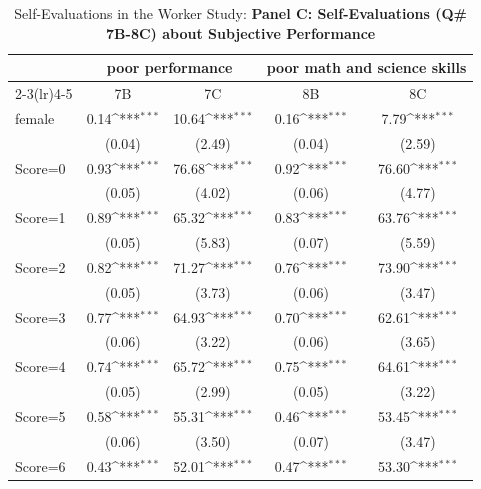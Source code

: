 \begin{table}[htbp]\centering
\def\sym#1{\ifmmode^{#1}\else\(^{#1}\)\fi}
\caption{Self-Evaluations in the Worker Study: \textbf{Panel C: Self-Evaluations (Q\# 7B-8C) about Subjective Performance}}
\begin{tabular}{l*{4}{c}}
\hline\hline
                &\multicolumn{2}{c}{poor performance} &\multicolumn{2}{c}{poor math and science skills}\\\cmidrule(lr){2-3}\cmidrule(lr){4-5}
                &\multicolumn{1}{c}{7B}&\multicolumn{1}{c}{7C}&\multicolumn{1}{c}{8B}&\multicolumn{1}{c}{8C}\\
\hline
female          &     0.14\sym{***}&    10.64\sym{***}&     0.16\sym{***}&     7.79\sym{***}\\
                &   (0.04)         &   (2.49)         &   (0.04)         &   (2.59)         \\
Score=0         &     0.93\sym{***}&    76.68\sym{***}&     0.92\sym{***}&    76.60\sym{***}\\
                &   (0.05)         &   (4.02)         &   (0.06)         &   (4.77)         \\
Score=1         &     0.89\sym{***}&    65.32\sym{***}&     0.83\sym{***}&    63.76\sym{***}\\
                &   (0.05)         &   (5.83)         &   (0.07)         &   (5.59)         \\
Score=2         &     0.82\sym{***}&    71.27\sym{***}&     0.76\sym{***}&    73.90\sym{***}\\
                &   (0.05)         &   (3.73)         &   (0.06)         &   (3.47)         \\
Score=3         &     0.77\sym{***}&    64.93\sym{***}&     0.70\sym{***}&    62.61\sym{***}\\
                &   (0.06)         &   (3.22)         &   (0.06)         &   (3.65)         \\
Score=4         &     0.74\sym{***}&    65.72\sym{***}&     0.75\sym{***}&    64.61\sym{***}\\
                &   (0.05)         &   (2.99)         &   (0.05)         &   (3.22)         \\
Score=5         &     0.58\sym{***}&    55.31\sym{***}&     0.46\sym{***}&    53.45\sym{***}\\
                &   (0.06)         &   (3.50)         &   (0.07)         &   (3.47)         \\
Score=6         &     0.43\sym{***}&    52.01\sym{***}&     0.47\sym{***}&    53.30\sym{***}\\

\end{tabular}
\end{table}
